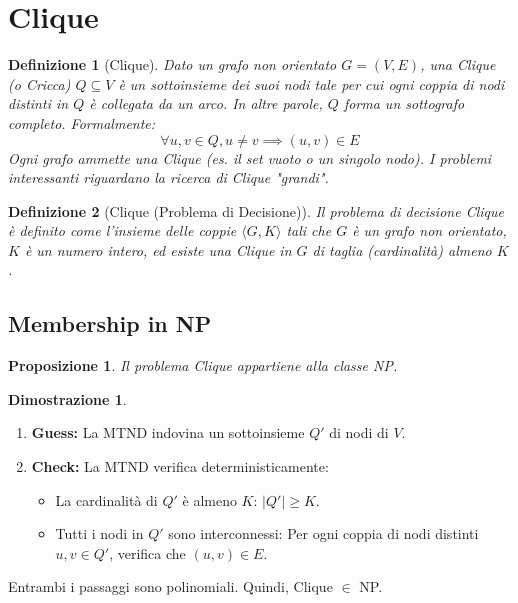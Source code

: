 \documentclass[a4paper]{article}
\newtheorem{definition}{Definizione}[section]
\newtheorem{proposition}{Proposizione}[section]
\theoremstyle{definition} %
\newtheorem*{proof*}{Dimostrazione}
\begin{document}
\section{Clique}

\begin{definition}[Clique]
Dato un grafo non orientato $G=(V, E)$, una \emph{Clique} (o Cricca) $Q \subseteq V$ è un sottoinsieme dei suoi nodi tale per cui ogni coppia di nodi distinti in $Q$ è collegata da un arco. In altre parole, $Q$ forma un sottografo completo. Formalmente:
\[ \forall u, v \in Q, u \ne v \implies (u, v) \in E \]
Ogni grafo ammette una Clique (es. il set vuoto o un singolo nodo). I problemi interessanti riguardano la ricerca di Clique "grandi".
\end{definition}

\begin{definition}[Clique (Problema di Decisione)]
Il problema di decisione \emph{Clique} è definito come l'insieme delle coppie $\langle G, K \rangle$ tali che $G$ è un grafo non orientato, $K$ è un numero intero, ed esiste una Clique in $G$ di taglia (cardinalità) almeno $K$.
\end{definition}

\subsection{Membership in NP}

\begin{proposition}
Il problema \emph{Clique} appartiene alla classe NP.
\end{proposition}

\begin{proof*}
\begin{enumerate}
    \item \textbf{Guess:} La MTND indovina un sottoinsieme $Q'$ di nodi di $V$.
    \item \textbf{Check:} La MTND verifica deterministicamente:
    \begin{itemize}
        \item La cardinalità di $Q'$ è almeno $K$: $|Q'| \ge K$.
        \item Tutti i nodi in $Q'$ sono interconnessi: Per ogni coppia di nodi distinti $u, v \in Q'$, verifica che $(u, v) \in E$.
    \end{itemize}
\end{enumerate}
Entrambi i passaggi sono polinomiali. Quindi, Clique $\in$ NP.
\end{proof*}
\end{document}
